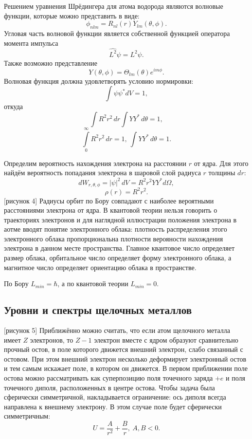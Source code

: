 Решением уравнения Шрёдингера для атома водорода являются волновые функции,
которые можно представить в виде:
\[
\phi_{nlm} = R_{nl}(r) Y_{lm}(\theta, \phi).
\]
Угловая часть волновой функции является собственной функцией оператора момента
импульса
\[
    \hat{L^2}\psi = L^2\psi.
\]
Также возможно представление
\[
    Y(\theta, \phi) = \Theta_{lm}(\theta)e^{im\phi}.
\]
Волновая функция должна удовлетворять условию нормировки:
\[
    \int \psi\psi^* dV = 1,
\]
откуда 
\[
    \int R^2 r^2\,dr \int YY^*\,d\theta = 1,
\]
\[
    \int\limits_0^\infty R^2 r^2\,dr = 1,\ \int YY^*\,d\theta = 1.
\]

Определим вероятность нахождения электрона на расстоянии \( r \) от ядра.
Для этого найдём вероятность попадания электрона в шаровой слой радиуса \( r \)
толщины \( dr \):
\[
    dW_{r,\theta,\phi} = |\psi|^2\,dV = R^2 r^2 Y Y^* d \Omega,
\]
\[
    \rho(r) = R^2 r^2.
\]
[рисунок 4]
Радиусы орбит по Бору совпадают с наиболее вероятными расстояниями электрона от
ядра. В квантовой теории нельзя говорить о траекториях электронов и для
наглядной иллюстрации положения электрона в аотме вводят понятие электронного
облака: плотность распределения этого электронного облака пропорциональна
плотности верояности нахождения электрона в данном месте пространства.
Главное квантовое число определяет размер облака, орбитальное число определяет
форму электронного облака, а магнитное число определяет ориентацию облака в
пространстве.

По Бору \( L_{min} = \hbar \), а по квантовой теории \( L_{min} = 0 \).

\subsection{Уровни и спектры щелочных металлов}
[рисунок 5]
Приближённо можно считать, что если атом щелочного металла имеет \( Z \)
электронов, то \( Z-1 \) электрон вместе с ядром образуют сравнительно прочный
остов, в поле которого движется внешний электрон, слабо связанный с остовом.
При этом внешний электрон несколько деформирует электронный остов и тем самым
искажает поле, в котором он движется. В первом приближении поле остова можно
рассматривать как суперпозицию поля точечного заряда \( +e \) и поля точечного
диполя, расположенных в центре остова. Чтобы задача была сферически симметричной,
накладывается ограничение: ось диполя всегда направлена к внешнему электрону.
В этом случае поле будет сферически симметричным:
\[
    U = \frac{A}{r^2} + \frac{B}{r},\ A,B < 0.
\]

